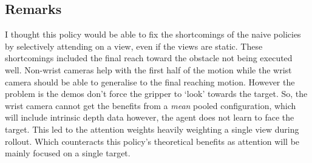 \subsection{Remarks}
I thought this policy would be able to fix the shortcomings of the naive policies by selectively attending on a view, even if the views are static. These shortcomings included the final reach toward the obstacle not being executed well. Non-wrist cameras help with the first half of the motion while the wrist camera should be able to generalise to the final reaching motion. However the problem is the demos don't force the gripper to `look' towards the target. So, the wrist camera cannot get the benefits from a \emph{mean} pooled configuration, which will include intrinsic depth data however, the agent does not learn to face the target. This led to the attention weights heavily weighting a single view during rollout. Which counteracts this policy's theoretical benefits as attention will be mainly focused on a single target.

